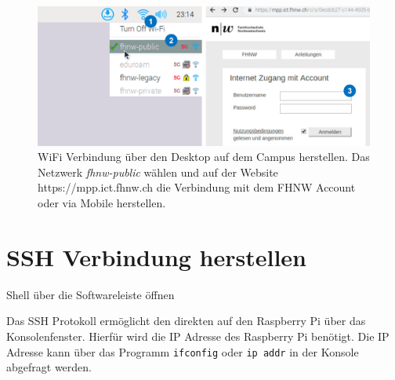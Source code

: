 \documentclass[
  11pt,
  a4paper,
  oneside, openany  ,captions=tableheading
]{scrbook}
\theoremstyle{remark}
\begin{document}
\begin{figure}[H]

{\centering \includegraphics{images/raspberry_pi_image_wifi_cmu.png}

}

\caption{WiFi Verbindung über den Desktop auf dem Campus herstellen. Das
Netzwerk \emph{fhnw-public} wählen und auf der Website
https://mpp.ict.fhnw.ch die Verbindung mit dem FHNW Account oder via
Mobile herstellen.}

\end{figure}%

\section{\texorpdfstring{SSH Verbindung
herstellen}{SSH Verbindung herstellen}}\label{ssh-verbindung-herstellen}

\begin{marginfigure}


\caption{\label{fig-shell}Shell über die Softwareleiste öffnen}

\end{marginfigure}%

Das SSH Protokoll ermöglicht den direkten auf den Raspberry Pi über das
Konsolenfenster. Hierfür wird die IP Adresse des Raspberry Pi benötigt.
Die IP Adresse kann über das Programm \texttt{ifconfig} oder
\texttt{ip\ addr} in der Konsole abgefragt werden.
\end{document}
